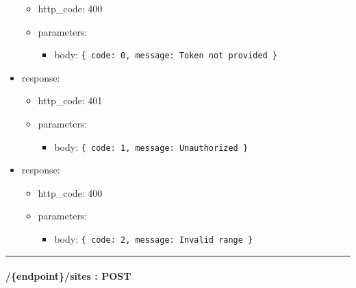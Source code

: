 \documentclass[
]{article}
\begin{document}
\begin{itemize}
  \begin{itemize}
  \item
    http\_code: 400
  \item
    parameters:

    \begin{itemize}
    \item
      body: \texttt{\{
      \textquotesingle{}code\textquotesingle{}:\ 0,\ 
      \textquotesingle{}message\textquotesingle{}:\ \textquotesingle{}Token\ not\ provided\textquotesingle{}
      \}}
    \end{itemize}
  \end{itemize}
\item
  response:

  \begin{itemize}
  \item
    http\_code: 401
  \item
    parameters:

    \begin{itemize}
    \item
      body: \texttt{\{
      \textquotesingle{}code\textquotesingle{}:\ 1,\ 
      \textquotesingle{}message\textquotesingle{}:\ \textquotesingle{}Unauthorized\textquotesingle{}
      \}}
    \end{itemize}
  \end{itemize}
\item
  response:

  \begin{itemize}
  \item
    http\_code: 400
  \item
    parameters:

    \begin{itemize}
    \item
      body: \texttt{\{
      \textquotesingle{}code\textquotesingle{}:\ 2,\ 
      \textquotesingle{}message\textquotesingle{}:\ \textquotesingle{}Invalid\ range\textquotesingle{}
      \}}
    \end{itemize}
  \end{itemize}
\end{itemize}

\begin{center}\rule{0.5\linewidth}{0.5pt}\end{center}

\hypertarget{header-n61236}{%
\paragraph{/\{endpoint\}/sites : POST}\label{header-n61236}}
\end{document}
